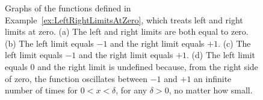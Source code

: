 \Qed

\begin{figure}[htb]%
\centering
\hfill
{}%
\hspace{45pt}%
%
\hfill
{}%
\hfill
{}%
    \caption[]{Graphs of the functions defined in Example~\ref{ex:LeftRightLimitsAtZero}, which treats left and right limits at zero. (a) The left and right limits are both equal to zero. (b) The left limit equals $-1$ and the right limit equals $+1$. (c) The left limit equals $-1$ and the right limit equals $+1$. (d) The left limit equals $0$ and the right limit is undefined because, from the right side of zero, the function oscillates between $-1$ and $+1$ an infinite number of times for $0 < x < \delta$, for any $\delta > 0$, no matter how small.}
    \label{fig:LimitsLeftRIghtAtZero}
\end{figure}

